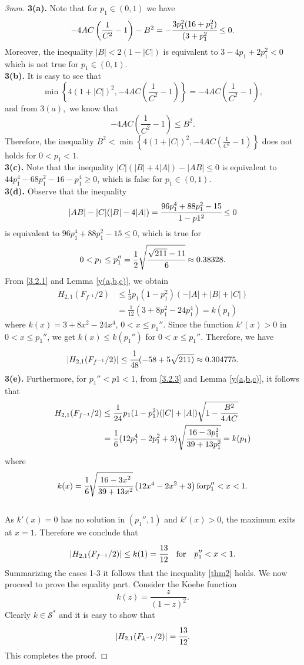 \documentclass[a4paper,12pt]{amsart}
\theoremstyle{definition}
\numberwithin{equation}{section}
\begin{document}
\begin{proof}
[3mm]
\textbf{3(a).} Note that for $p_{1} \in(0,1)$ we have
$$
-4 A C\left(\frac{1}{C^{2}}-1\right)-B^{2}=-\cfrac{3p_{1}^{2}(16+p_1^2)}{(3+p_{1}^{2}} \leq  0.
$$
Moreover, the inequality $|B|<2(1-|C|)$ is equivalent to $3 - 4 p_1 + 2 p_1^2 < 0$ which is not true for $p_{1} \in(0,1)$.\\
[3mm]
\textbf{3(b).} It is easy to see that
$$
\min \left\{4(1+|C|)^{2},-4 A C\left(\frac{1}{C^{2}}-1\right)\right\}=-4 A C\left(\frac{1}{C^{2}}-1\right),
$$
and from $3(a),$ we know that 
$$
-4 A C\left(\frac{1}{C^{2}}-1\right) \leq B^{2}.
$$
Therefore, the inequality $B^{2} < \min \left\{4(1+|C|)^{2},-4 A C\left(\frac{1}{C^{2}}-1\right)\right\}$ does not holds for $0<p_1<1$.\\
[3mm]
\textbf{3(c).} Note that the inequality $|C|(|B|+4|A|)-|A B| \leq 0$ is equivalent to $44p_1^4-68p_1^2
-16-p_1^4\geq 0$, which is false for $p_{1} \in(0,1)$.\\
[3mm]
\textbf{3(d).}
Observe that the inequality 
$$|A B|-|C|(|B|-4|A|)=\cfrac{96 p_1^4+88 p_1^2-15}{1 - p1^2} \leq 0
$$
is equivalent to $96 p_1^4+88 p_1^2-15\leq 0$, which is true for 
$$
0<p_1\leq p_1''=\frac{1}{2}\sqrt{\cfrac{\sqrt{211}-11}{6}} \approx 0.38328.
$$
From \eqref{3.2.1} and Lemma \ref{y(a,b,c)}, we obtain
\begin{equation}
\begin{aligned}
H_{2,1}(F_{f^{-1}}/2)
&\leq \frac{1}{3}p_1(1-p_1^2)(-|A|+|B|+|C|)\\
&= \frac{1}{12}(3+8p_1^2-24p_1^4)=k(p_1)
\end{aligned}
\end{equation}
where $k(x)=3+8x^2-24x^4$, $ 0< x\leq p_1''$. Since the function $k'(x)>0$ in $ 0< x\leq p_1''$, we get $k(x)\leq k(p_1'')$ for $ 0< x\leq p_1''$.
Therefore, we have
$$
|H_{2,1}(F_{f^{-1}}/2)|\leq \cfrac{1}{48}(-58+5\sqrt{211)} \approx 0.304775.
$$
\textbf{3(e).} Furthermore, for $p_1''<p1<1$, from \eqref{3.2.3} and Lemma \ref{y(a,b,c)}, it follows that 
\begin{equation}
\begin{aligned}
H_{2,1}(F_{f^{-1}}/2)
&\leq \frac{1}{24}p_1(1-p_1^2)(|C|+|A|) \sqrt{1-\frac{B^{2}}{4 A C}}\\
&= \frac{1}{6}(12p_1^4 -2p_1^2+3)\sqrt{\cfrac{16-3p_1^2}{39+13p_1^2}}=k(p_1)
\end{aligned}
\end{equation}
where $$k(x)=\cfrac{1}{6}\sqrt{\cfrac{16-3x^2}{39+13x^2}}\left(12x^4 -2x^2+3\right) \text{for} p_1''<x<1.$$ 
\\[1mm]
As $k'(x)=0$ has no solution in $(p_1'',1)$ and $k'(x)>0$, the maximum exits at $x=1$.
Therefore we conclude that 
$$ |H_{2,1}(F_{f^{-1}}/2)| \leq k(1)=\cfrac{13}{12} \quad \text{for} \quad p_1''<x<1.
$$
Summarizing the cases 1-3 it follows that the inequality \eqref{thm2} holds. We now proceed to prove the equality part. Consider the Koebe function 
$$
k(z)=\frac{z}{(1-z)^2}.
$$
Clearly $k \in \mathcal{S}^*$ and it is easy to show that 
$$
|H_{2,1}(F_{k^{-1}}/2)|=\cfrac{13}{12}.
$$
This completes the proof.

\end{proof}
\end{document}

